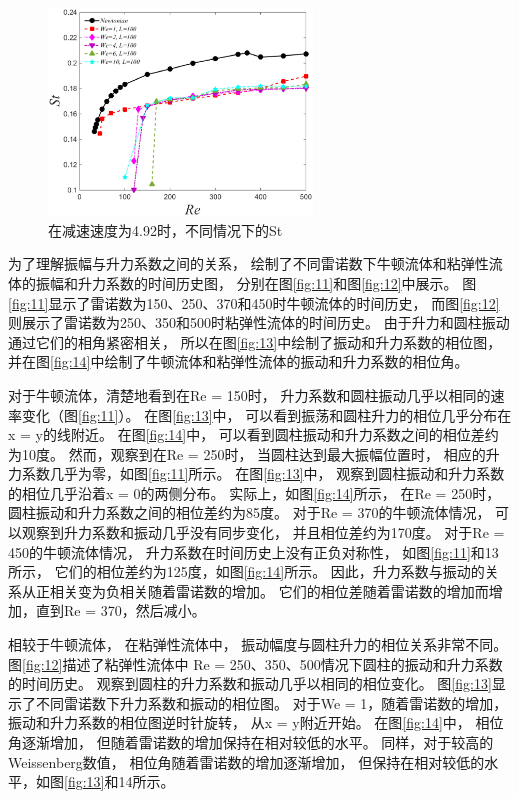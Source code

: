 \documentclass[UTF8,zihao=5]{ctexart} %
\begin{document}
\begin{figure}[htbp]
    \centering
    \includegraphics[width=7cm]{fig15.jpg}
    \caption{
        在减速速度为4.92时，不同情况下的St
    }
    \label{fig:15}
\end{figure}


为了理解振幅与升力系数之间的关系，
绘制了不同雷诺数下牛顿流体和粘弹性流体的振幅和升力系数的时间历史图，
分别在图\ref{fig:11}和图\ref{fig:12}中展示。
图\ref{fig:11}显示了雷诺数为150、250、370和450时牛顿流体的时间历史，
而图\ref{fig:12}则展示了雷诺数为250、350和500时粘弹性流体的时间历史。
由于升力和圆柱振动通过它们的相角紧密相关，
所以在图\ref{fig:13}中绘制了振动和升力系数的相位图，
并在图\ref{fig:14}中绘制了牛顿流体和粘弹性流体的振动和升力系数的相位角。


对于牛顿流体，清楚地看到在Re = 150时，
升力系数和圆柱振动几乎以相同的速率变化（图\ref{fig:11}）。
在图\ref{fig:13}中，
可以看到振荡和圆柱升力的相位几乎分布在x = y的线附近。
在图\ref{fig:14}中，
可以看到圆柱振动和升力系数之间的相位差约为10度。
然而，观察到在Re = 250时，
当圆柱达到最大振幅位置时，
相应的升力系数几乎为零，如图\ref{fig:11}所示。
在图\ref{fig:13}中，
观察到圆柱振动和升力系数的相位几乎沿着x = 0的两侧分布。
实际上，如图\ref{fig:14}所示，
在Re = 250时，
圆柱振动和升力系数之间的相位差约为85度。
对于Re = 370的牛顿流体情况，
可以观察到升力系数和振动几乎没有同步变化，
并且相位差约为170度。
对于Re = 450的牛顿流体情况，
升力系数在时间历史上没有正负对称性，
如图\ref{fig:11}和13所示，
它们的相位差约为125度，如图\ref{fig:14}所示。
因此，升力系数与振动的关系从正相关变为负相关随着雷诺数的增加。
它们的相位差随着雷诺数的增加而增加，直到Re = 370，然后减小。

相较于牛顿流体，
在粘弹性流体中，
振动幅度与圆柱升力的相位关系非常不同。
图\ref{fig:12}描述了粘弹性流体中
Re = 250、350、500情况下圆柱的振动和升力系数的时间历史。
观察到圆柱的升力系数和振动几乎以相同的相位变化。
图\ref{fig:13}显示了不同雷诺数下升力系数和振动的相位图。
对于We = 1，随着雷诺数的增加，
振动和升力系数的相位图逆时针旋转，
从x = y附近开始。
在图\ref{fig:14}中，
相位角逐渐增加，
但随着雷诺数的增加保持在相对较低的水平。
同样，对于较高的Weissenberg数值，
相位角随着雷诺数的增加逐渐增加，
但保持在相对较低的水平，如图\ref{fig:13}和14所示。
\end{document}
